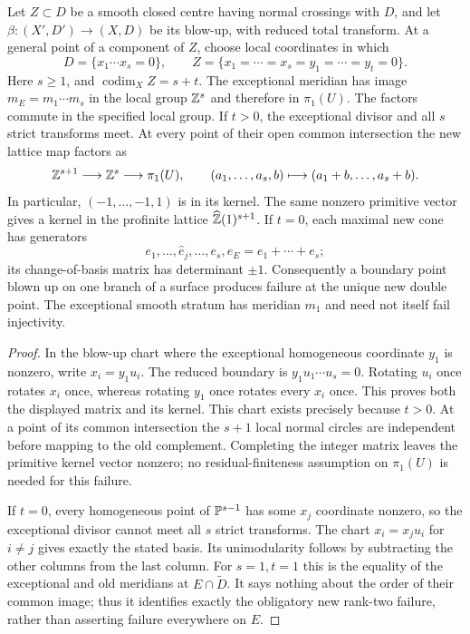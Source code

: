 \begin{theorem}\label{P2a}
Let $Z\subset D$ be a smooth closed centre having normal crossings with $D$,
and let $\beta:(X',D')\to(X,D)$ be its blow-up, with reduced total transform.
At a general point of a component of $Z$, choose local coordinates in which
\[
 D=\{x_1\cdots x_s=0\},\qquad
 Z=\{x_1=\cdots=x_s=y_1=\cdots=y_t=0\}.
\]
Here $s\geq1$, and $\operatorname{codim}_X Z=s+t$.  The exceptional meridian
has image $m_E=m_1\cdots m_s$ in the local group $\mathbb Z^s$ and therefore in
$\pi_1(U)$.  The factors commute in the specified local group.
If $t>0$, the exceptional divisor and all $s$ strict transforms meet.
At every point of their open common intersection the new lattice map factors as
\[
 \mathbb Z^{s+1}\longrightarrow\mathbb Z^s\longrightarrow\pi_1(U),\qquad
 (a_1,\ldots,a_s,b)\longmapsto(a_1+b,\ldots,a_s+b).
\]
In particular, $(-1,\ldots,-1,1)$ is in its kernel.  The same nonzero primitive
vector gives a kernel in the profinite lattice $\widehat{\mathbb Z}(1)^{s+1}$.
If $t=0$, each maximal new cone has generators
\[
 e_1,\ldots,\widehat e_j,\ldots,e_s,
 e_E=e_1+\cdots+e_s;
\]
its change-of-basis matrix has determinant $\pm1$.
Consequently a boundary point blown up on one branch of a surface produces
failure at the unique new double point.  The exceptional smooth stratum has
meridian $m_1$ and need not itself fail injectivity.
\end{theorem}
\begin{proof}
In the blow-up chart where the exceptional homogeneous coordinate $y_1$ is
nonzero, write $x_i=y_1u_i$.  The reduced boundary is
$y_1u_1\cdots u_s=0$.  Rotating $u_i$ once rotates $x_i$ once, whereas rotating
$y_1$ once rotates every $x_i$ once.  This proves both the displayed matrix
and its kernel.  This chart exists precisely because $t>0$.  At a point of its
common intersection the $s+1$ local normal circles are independent before
mapping to the old complement.  Completing the integer matrix leaves the
primitive kernel vector nonzero; no residual-finiteness assumption on
$\pi_1(U)$ is needed for this failure.

If $t=0$, every homogeneous point of $\mathbb P^{s-1}$ has some $x_j$ coordinate
nonzero, so the exceptional divisor cannot meet all $s$ strict transforms.
The chart $x_i=x_ju_i$ for $i\ne j$ gives exactly the stated basis.  Its
unimodularity follows by subtracting the other columns from the last column.
For $s=1,t=1$ this is the equality of the exceptional and old meridians at
$E\cap\widetilde D$.  It says nothing about the order of their common image;
thus it identifies exactly the obligatory new rank-two failure, rather than
asserting failure everywhere on $E$.
\end{proof}

